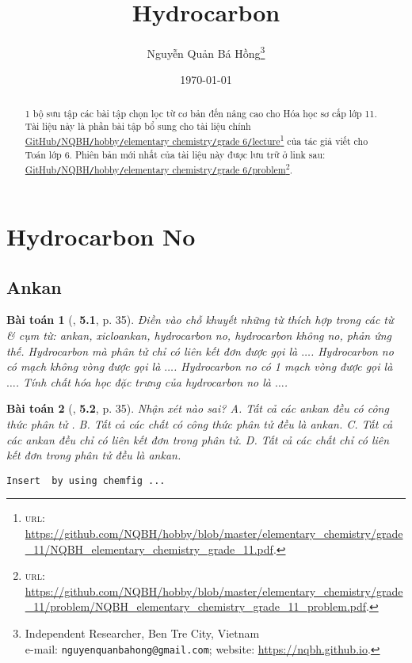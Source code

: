 \documentclass{article}
\title{Hydrocarbon}
\author{Nguyễn Quản Bá Hồng\footnote{Independent Researcher, Ben Tre City, Vietnam\\e-mail: \texttt{nguyenquanbahong@gmail.com}; website: \url{https://nqbh.github.io}.}}
\date{\today}
\numberwithin{equation}{section}
\newtheorem{baitoan}{Bài toán}[section]
\begin{document}
\maketitle
\begin{abstract}
	1 bộ sưu tập các bài tập chọn lọc từ cơ bản đến nâng cao cho Hóa học sơ cấp lớp 11. Tài liệu này là phần bài tập bổ sung cho tài liệu chính \href{https://github.com/NQBH/hobby/blob/master/elementary_chemistry/grade_11/NQBH_elementary_chemistry_grade_11.pdf}{GitHub\texttt{/}NQBH\texttt{/}hobby\texttt{/}elementary chemistry\texttt{/}grade 6\texttt{/}lecture}\footnote{\textsc{url}: \url{https://github.com/NQBH/hobby/blob/master/elementary_chemistry/grade_11/NQBH_elementary_chemistry_grade_11.pdf}.} của tác giả viết cho Toán lớp 6. Phiên bản mới nhất của tài liệu này được lưu trữ ở link sau: \href{https://github.com/NQBH/hobby/blob/master/elementary_chemistry/grade_11/problem/NQBH_elementary_chemistry_grade_11_problem.pdf}{GitHub\texttt{/}NQBH\texttt{/}hobby\texttt{/}elementary chemistry\texttt{/}grade 6\texttt{/}problem}\footnote{\textsc{url}: \url{https://github.com/NQBH/hobby/blob/master/elementary_chemistry/grade_11/problem/NQBH_elementary_chemistry_grade_11_problem.pdf}.}.
\end{abstract}
\tableofcontents
\newpage


\section{Hydrocarbon No}

\subsection{Ankan}

\begin{baitoan}[\cite{SBT_Hoa_Hoc_11_co_ban}, \textbf{5.1}, p. 35]
	Điền vào chỗ khuyết những từ thích hợp trong các từ \& cụm từ: \emph{ankan, xicloankan, hydrocarbon no, hydrocarbon không no, phản ứng thế}. Hydrocarbon mà phân tử chỉ có liên kết đơn được gọi là $\ldots$. Hydrocarbon no có mạch không vòng được gọi là $\ldots$. Hydrocarbon no có 1 mạch vòng được gọi là $\ldots$. Tính chất hóa học đặc trưng của hydrocarbon no là $\ldots$.
\end{baitoan}

\begin{baitoan}[\cite{SBT_Hoa_Hoc_11_co_ban}, \textbf{5.2}, p. 35]
	Nhận xét nào sai? {\sf A.} Tất cả các ankan đều có công thức phân tử \emph{}. {\sf B.} Tất cả các chất có công thức phân tử \emph{} đều là ankan. {\sf C.} Tất cả các ankan đều chỉ có liên kết đơn trong phân tử. {\sf D.} Tất cả các chất chỉ có liên kết đơn trong phân tử đều là ankan.
\end{baitoan}
\texttt{Insert \cite[\textbf{5.3.}, \textbf{5.4.}, pp. 35--36]{SBT_Hoa_Hoc_11_co_ban} by using chemfig ...}
\end{document}
